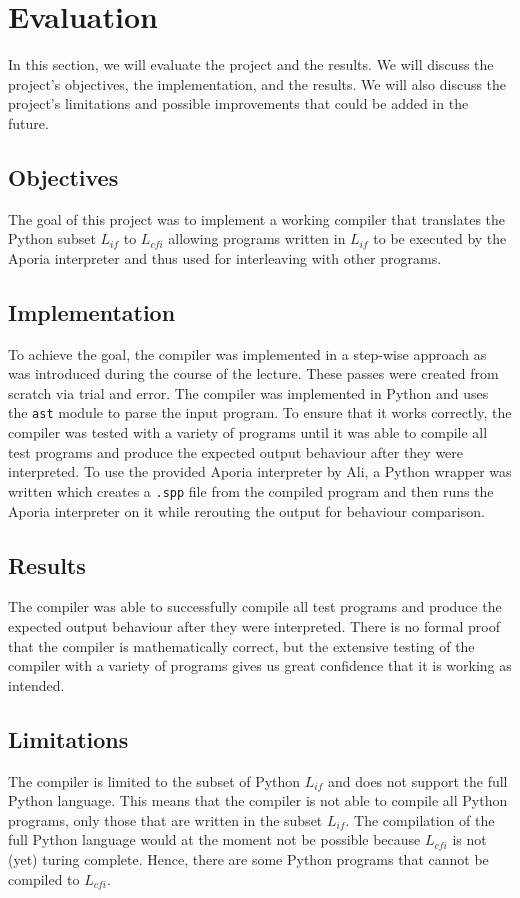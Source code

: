 \newpage
\section{Evaluation}

In this section, we will evaluate the project and the results. We will discuss the project's objectives, the implementation, and the results. We will also discuss the project's limitations and possible improvements that could be added in the future.

\subsection{Objectives}
The goal of this project was to implement a working compiler that translates the Python subset $L_{if}$ to $L_{cfi}$ allowing programs written in $L_{if}$ to be executed by the Aporia interpreter and thus used for interleaving with other programs.

\subsection{Implementation}
To achieve the goal, the compiler was implemented in a step-wise approach as was introduced during the course of the lecture. These passes were created from scratch via trial and error. The compiler was implemented in Python and uses the \texttt{ast} module to parse the input program. To ensure that it works correctly, the compiler was tested with a variety of programs until it was able to compile all test programs and produce the expected output behaviour after they were interpreted.
To use the provided Aporia interpreter by Ali, a Python wrapper was written which creates a \texttt{.spp} file from the compiled program and then runs the Aporia interpreter on it while rerouting the output for behaviour comparison.

\subsection{Results}
The compiler was able to successfully compile all test programs and produce the expected output behaviour after they were interpreted. There is no formal proof that the compiler is mathematically correct, but the extensive testing of the compiler with a variety of programs gives us great confidence that it is working as intended.

\subsection{Limitations}
The compiler is limited to the subset of Python $L_{if}$ and does not support the full Python language. This means that the compiler is not able to compile all Python programs, only those that are written in the subset $L_{if}$.
The compilation of the full Python language would at the moment not be possible because $L_{cfi}$ is not (yet) turing complete. Hence, there are some Python programs that cannot be compiled to $L_{cfi}$.


